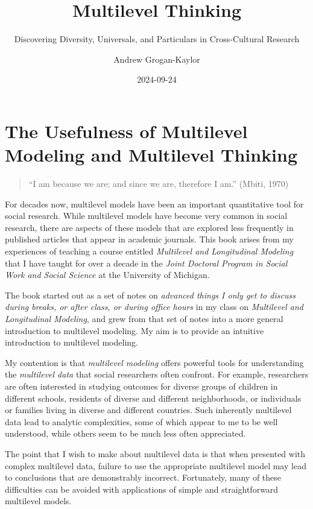 \documentclass[
  letterpaper,
  DIV=11,
  numbers=noendperiod]{scrreprt}
\title{Multilevel Thinking}
\subtitle{Discovering Diversity, Universals, and Particulars in
Cross-Cultural Research}
\author{Andrew Grogan-Kaylor}
\date{2024-09-24}
\renewcommand*\contentsname{Table of contents}
\newcommand\contentsname{Table of contents}
\begin{document}
\maketitle

\renewcommand*\contentsname{Table of contents}
{
\hypersetup{linkcolor=}
\setcounter{tocdepth}{2}
\tableofcontents
}
\listoffigures
\listoftables


\chapter{The Usefulness of Multilevel Modeling and Multilevel
Thinking}\label{sec-multilevel-thinking}

\begin{quote}
``I am because we are; and since we are, therefore I am.'' (Mbiti, 1970)
\end{quote}

For decades now, multilevel models have been an important quantitative
tool for social research. While multilevel models have become very
common in social research, there are aspects of these models that are
explored less frequently in published articles that appear in academic
journals. This book arises from my experiences of teaching a course
entitled \emph{Multilevel and Longitudinal Modeling} that I have taught
for over a decade in the \emph{Joint Doctoral Program in Social Work and
Social Science} at the University of Michigan.

The book started out as a set of notes on \emph{advanced things I only
get to discuss during breaks, or after class, or during office hours} in
my class on \emph{Multilevel and Longitudinal Modeling}, and grew from
that set of notes into a more general introduction to multilevel
modeling. My aim is to provide an intuitive introduction to multilevel
modeling.

My contention is that \emph{multilevel modeling} offers powerful tools
for understanding the \emph{multilevel data} that social researchers
often confront. For example, researchers are often interested in
studying outcomes for diverse groups of children in different schools,
residents of diverse and different neighborhoods, or individuals or
families living in diverse and different countries. Such inherently
multilevel data lead to analytic complexities, some of which appear to
me to be well understood, while others seem to be much less often
appreciated.

The point that I wish to make about multilevel data is that when
presented with complex multilevel data, failure to use the appropriate
multilevel model may lead to conclusions that are demonstrably
incorrect. Fortunately, many of these difficulties can be avoided with
applications of simple and straightforward multilevel models.
 
\end{document}
